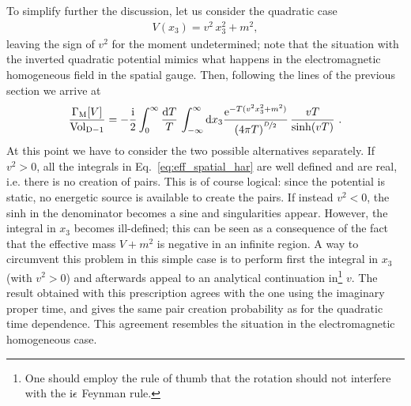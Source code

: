 \documentclass[12pt,a4paper]{article}
\numberwithin{equation}{section}
\numberwithin{equation}{section}
\newcommand{\mathi}{{\rm i}}
\begin{document}
To simplify further the discussion, let us consider the quadratic case 
\begin{align}
    V(x_3)=v^2 \, x_3^2+m^2,
\end{align}
leaving the sign of $v^2$ for the moment undetermined; note that the situation with the inverted quadratic potential mimics what happens in the electromagnetic homogeneous field in the spatial gauge. 
Then, following the lines of the previous section we arrive at
\begin{align}\label{eq:eff_spatial_har}
    \frac{\Gamma_\mathrm{M}[V]}{\operatorname{Vol}_{\rm D-1}}=-\frac{\mathi}{2} \int_0^{\infty} \frac{{\rm d} T}{T} \, \int^{\infty}_{-\infty}{\rm d}x_3\frac{\mathrm{e}^{-T(v^2{x}_3^2+m^2)}}{\left( 4\pi T \right)^{\nicefrac{D}{2}}} \,  \frac{v T}{\sinh(v T)}\ .
\end{align}
At this point we have to consider the two possible alternatives separately. If $v^2>0$, all the integrals in Eq.~\eqref{eq:eff_spatial_har} are well defined and are real, i.e. there is no  creation of pairs. This is of course logical: since the potential is static, no energetic source is available to create the pairs. If instead $v^2<0$, the sinh in the denominator becomes a sine and singularities appear. 
However, the integral in $x_3$ becomes ill-defined; this can be seen as a consequence of the fact that the effective mass $V+m^2$ is negative in an infinite region. 
A way to circumvent this problem in this simple case is to perform first the integral in $x_3$ (with $v^2>0$) and afterwards appeal to an analytical continuation in\footnote{One should employ the rule of thumb that the rotation should not interfere with the $\mathi \epsilon$ Feynman rule.} $v$. The result obtained with this prescription agrees with the one using the imaginary proper time, and gives the same pair creation probability as for the quadratic time dependence. This agreement resembles the situation in the electromagnetic homogeneous case. 
\end{document}
